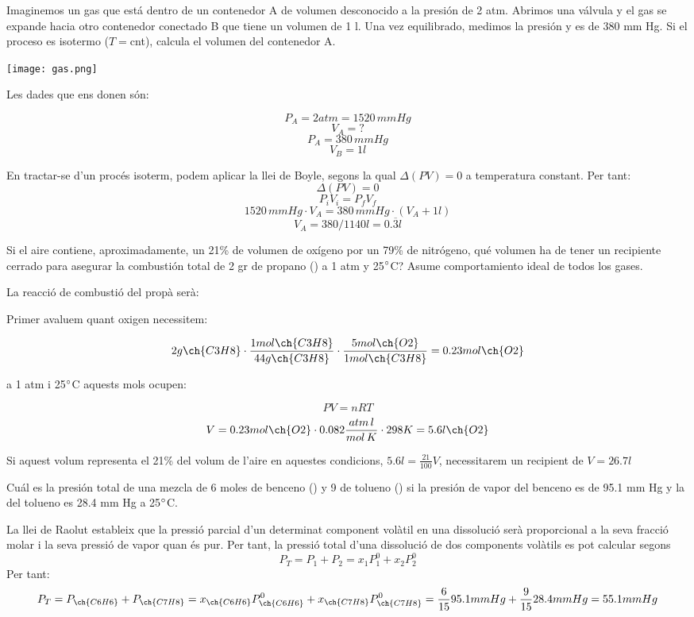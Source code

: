 \documentclass[11pt]{article}
\begin{document}
{Imaginemos un gas que está dentro de un contenedor A de volumen desconocido a la presión de 2 atm. Abrimos una válvula y el gas se expande hacia otro contenedor conectado B que tiene un volumen de 1 l. Una vez equilibrado, medimos la presión y es de 380 mm Hg. Si el proceso es isotermo ($T=$cnt), calcula el volumen del contenedor A.
\begin{center}
\texttt{[image: gas.png]}
\end{center}}
{
\vfill
\newpage
}
{
Les dades que ens donen són:

\[P_A=2atm=1520 \,mmHg\]
\[V_A=?\]
\[P_A=380 \,mmHg\]
\[V_B=1l\]

En tractar-se d'un procés isoterm, podem aplicar la llei de Boyle, segons la qual $\Delta (PV)=0$ a temperatura constant.
Per tant:
\[\Delta (PV)=0\]
\[P_i V_i = P_f V_f\]
\[1520  \,mmHg \cdot V_A = 380  \,mmHg \cdot (V_A + 1 l)\]
\[V_A = 380/1140 l = 0.\overline{3} l\]
}

{Si el aire contiene, aproximadamente, un 21\% de volumen de oxígeno por un 79\% de nitrógeno, qué volumen ha de tener un recipiente cerrado para asegurar la combustión total de  2 gr de propano () a 1 atm y 25$\degree$C? Asume comportamiento ideal de todos los gases.
}
{
\vfill
\newpage
}
{
La reacció de combustió del propà serà:


Primer avaluem quant oxigen necessitem:

\[2 g \ch{C3H8} \cdot \frac{1 mol \ch{C3H8}}{44 g \ch{C3H8}} \cdot \frac{5 mol \ch{O2}}{1 mol \ch{C3H8}}=0.23 mol \ch{O2}\]

a 1 atm i 25$\degree$C aquests mols ocupen:

\[PV=nRT\]
\[ V = 0.23mol \ch{O2} \cdot 0.082 \frac{atm \, l}{mol \, K} \cdot 298 K = 5.6l \ch{O2}\]

Si aquest volum representa el 21\% del volum de l'aire en aquestes condicions, $5.6l=\frac{21}{100}V$, necessitarem un recipient de $V=26.7l$
}

{Cuál es la presión total de una mezcla de 6 moles de benceno () y 9 de tolueno () si la presión de vapor del benceno es de 95.1 mm Hg y la del tolueno es 28.4 mm Hg a 25$\degree$C. 
}
{
\vfill

}
{
La llei de Raolut estableix que la pressió parcial d'un determinat component volàtil en una dissolució serà proporcional a la seva fracció molar i la seva pressió de vapor quan és pur. Per tant, la pressió total d'una dissolució de dos components volàtils es pot calcular segons 
\[
P_T=P_1+P_2=x_1P_1^0+x_2P_2^0
\]
Per tant:
\[
P_T=P_{\ch{C6H6}}+P_{\ch{C7H8}}=x_{\ch{C6H6}}P_{\ch{C6H6}}^0+x_{\ch{C7H8}}P_{\ch{C7H8}}^0=\frac{6}{15}95.1 mm Hg+\frac{9}{15}28.4 mm Hg=55.1mmHg
\]
}


\problemsdone
\end{document}
